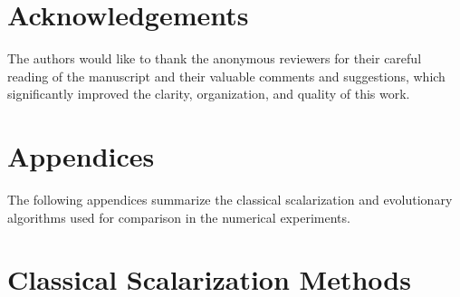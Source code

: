 \documentclass[11pt,pdflatex,sn-mathphys-ay]{sn-jnl}%
\theoremstyle{definition}
\theoremstyle{thmstyleone}%
\theoremstyle{thmstyletwo}%
\theoremstyle{thmstylethree}%
\begin{document}
	
	\section*{Acknowledgements}
	The authors would like to thank the anonymous reviewers for their careful reading of the manuscript and their valuable comments and suggestions, which significantly improved the clarity, organization, and quality of this work.
	
	\appendix  %
	\begin{appendices}
		\section*{Appendices}
		The following appendices summarize the classical scalarization and evolutionary algorithms used for comparison in the numerical experiments.
		\section{Classical Scalarization Methods}
		\label{appendix:A}

\end{appendices}
\end{document}
